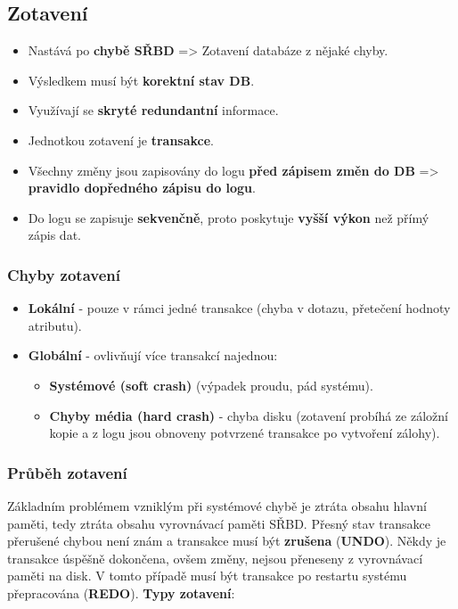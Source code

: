 \subsection{Zotavení}
\begin{itemize}
\item Nastává po \textbf{chybě SŘBD} => Zotavení databáze z nějaké chyby.
\item Výsledkem musí být \textbf{korektní stav DB}.
\item Využívají se\textbf{ skryté redundantní} informace.
\item Jednotkou zotavení je \textbf{transakce}.
\item Všechny změny jsou zapisovány do logu \textbf{před zápisem změn do DB} => \textbf{pravidlo dopředného zápisu do logu}.
\item Do logu se zapisuje \textbf{sekvenčně}, proto poskytuje \textbf{vyšší výkon} než přímý zápis dat.
\end{itemize}

\subsubsection{Chyby zotavení}
\begin{itemize}
\item\textbf{Lokální} - pouze v rámci jedné transakce (chyba v dotazu, přetečení hodnoty atributu).
\item\textbf{Globální} - ovlivňují více transakcí najednou:
\begin{itemize}
\item\textbf{Systémové (soft crash)} (výpadek proudu, pád systému).
\item\textbf{Chyby média (hard crash)} - chyba disku (zotavení probíhá ze záložní kopie a z logu jsou obnoveny potvrzené transakce po vytvoření zálohy).
\end{itemize}
\end{itemize}

\subsubsection{Průběh zotavení}
Základním problémem vzniklým při systémové chybě je ztráta obsahu hlavní paměti, tedy ztráta obsahu vyrovnávací paměti SŘBD. Přesný stav transakce přerušené chybou není znám a transakce musí být \textbf{zrušena} (\textbf{UNDO}). Někdy je transakce úspěšně dokončena, ovšem změny, nejsou přeneseny z vyrovnávací paměti na disk. V tomto případě musí být transakce po restartu systému přepracována (\textbf{REDO}). \textbf{Typy zotavení}: 

